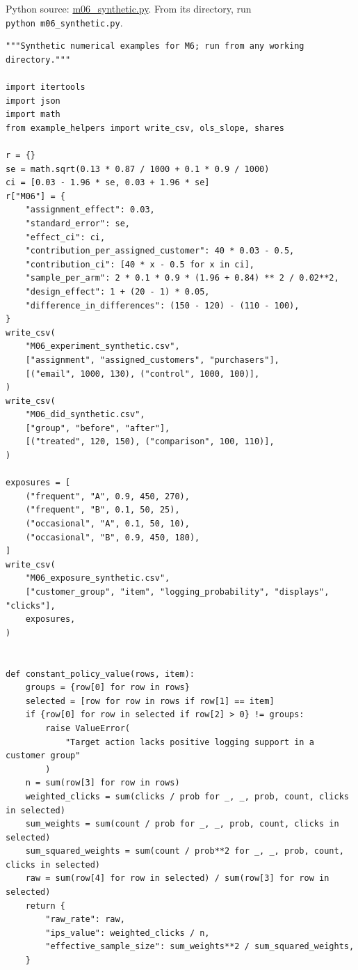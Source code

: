 \FloatBarrier
{}
Python source:
\href{../03_Data_and_Code/Lecture_Examples/m06_synthetic.py}{m06\_synthetic.py}.
From its directory, run \texttt{python\ m06\_synthetic.py}.

\begin{Verbatim}[breaklines,breakanywhere,fontsize=\small]
"""Synthetic numerical examples for M6; run from any working directory."""

import itertools
import json
import math
from example_helpers import write_csv, ols_slope, shares

r = {}
se = math.sqrt(0.13 * 0.87 / 1000 + 0.1 * 0.9 / 1000)
ci = [0.03 - 1.96 * se, 0.03 + 1.96 * se]
r["M06"] = {
    "assignment_effect": 0.03,
    "standard_error": se,
    "effect_ci": ci,
    "contribution_per_assigned_customer": 40 * 0.03 - 0.5,
    "contribution_ci": [40 * x - 0.5 for x in ci],
    "sample_per_arm": 2 * 0.1 * 0.9 * (1.96 + 0.84) ** 2 / 0.02**2,
    "design_effect": 1 + (20 - 1) * 0.05,
    "difference_in_differences": (150 - 120) - (110 - 100),
}
write_csv(
    "M06_experiment_synthetic.csv",
    ["assignment", "assigned_customers", "purchasers"],
    [("email", 1000, 130), ("control", 1000, 100)],
)
write_csv(
    "M06_did_synthetic.csv",
    ["group", "before", "after"],
    [("treated", 120, 150), ("comparison", 100, 110)],
)

exposures = [
    ("frequent", "A", 0.9, 450, 270),
    ("frequent", "B", 0.1, 50, 25),
    ("occasional", "A", 0.1, 50, 10),
    ("occasional", "B", 0.9, 450, 180),
]
write_csv(
    "M06_exposure_synthetic.csv",
    ["customer_group", "item", "logging_probability", "displays", "clicks"],
    exposures,
)


def constant_policy_value(rows, item):
    groups = {row[0] for row in rows}
    selected = [row for row in rows if row[1] == item]
    if {row[0] for row in selected if row[2] > 0} != groups:
        raise ValueError(
            "Target action lacks positive logging support in a customer group"
        )
    n = sum(row[3] for row in rows)
    weighted_clicks = sum(clicks / prob for _, _, prob, count, clicks in selected)
    sum_weights = sum(count / prob for _, _, prob, count, clicks in selected)
    sum_squared_weights = sum(count / prob**2 for _, _, prob, count, clicks in selected)
    raw = sum(row[4] for row in selected) / sum(row[3] for row in selected)
    return {
        "raw_rate": raw,
        "ips_value": weighted_clicks / n,
        "effective_sample_size": sum_weights**2 / sum_squared_weights,
    }



\end{Verbatim}
